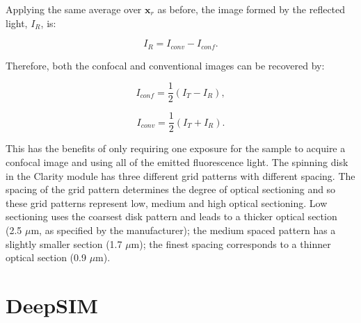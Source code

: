 Applying the same average over $\textbf{x}_{r}$ as before, 
the image formed by the reflected light, $I_{R}$, is:

\begin{equation}\label{eq:reflected_image}
I_{R} = I_{conv} - I_{conf}.
\end{equation}

Therefore, both the confocal and conventional images can 
be recovered by:

\begin{equation}\label{eq:confocal_image}
I_{conf} = \frac{1}{2}\left(I_{T} - I_{R}\right),
\end{equation}

\begin{equation}\label{eq:conventional_image}
I_{conv} = \frac{1}{2}\left(I_{T} + I_{R}\right).
\end{equation}

This has the benefits of only requiring one exposure for 
the sample to acquire a confocal image and using all of 
the emitted fluorescence light. The spinning disk in the 
Clarity module has three different grid patterns with 
different spacing. The spacing of the grid pattern determines
the degree of optical sectioning and so these grid patterns
represent low, medium and high optical sectioning\cite{neil1997method}. Low sectioning uses the coarsest disk pattern and leads to a thicker optical section (2.5 $\mu$m, as specified by the manufacturer); the medium spaced pattern has a slightly smaller section (1.7 $\mu$m); the finest spacing corresponds to a thinner optical section (0.9 $\mu$m)\cite{hussain2020wavefront}. 

\section{DeepSIM}
\label{sec:DeepSIM}

